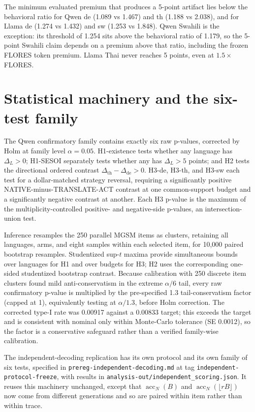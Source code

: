 \documentclass[11pt]{article}
\begin{document}
The minimum evaluated premium that produces a 5-point artifact lies below the behavioral ratio for Qwen de (1.089 vs 1.467) and th (1.188 vs 2.038), and for Llama de (1.274 vs 1.432) and sw (1.253 vs 1.848). Qwen Swahili is the exception: its threshold of 1.254 sits above the behavioral ratio of 1.179, so the 5-point Swahili claim depends on a premium above that ratio, including the frozen FLORES token premium. Llama Thai never reaches 5 points, even at \(1.5\times\) FLORES.

\section{Statistical machinery and the six-test family}
\label{app:stats}

The Qwen confirmatory family contains exactly six raw p-values, corrected by Holm at family level \(\alpha=0.05\). H1-existence tests whether any language has \(\Delta_L>0\); H1-SESOI separately tests whether any has \(\Delta_L>5\) points; and H2 tests the directional ordered contrast \(\Delta_{\mathrm{th}}-\Delta_{\mathrm{de}}>0\). H3-de, H3-th, and H3-sw each test for a dollar-matched strategy reversal, requiring a significantly positive NATIVE-minus-TRANSLATE-ACT contrast at one common-support budget and a significantly negative contrast at another. Each H3 p-value is the maximum of the multiplicity-controlled positive- and negative-side p-values, an intersection-union test.

Inference resamples the 250 parallel MGSM items as clusters, retaining all languages, arms, and eight samples within each selected item, for 10,000 paired bootstrap resamples. Studentized sup-\(t\) maxima provide simultaneous bounds over languages for H1 and over budgets for H3; H2 uses the corresponding one-sided studentized bootstrap contrast. Because calibration with 250 discrete item clusters found mild anti-conservatism in the extreme \(\alpha/6\) tail, every raw confirmatory p-value is multiplied by the pre-specified 1.3 tail-conservatism factor (capped at 1), equivalently testing at \(\alpha/1.3\), before Holm correction.
The corrected type-I rate was 0.00917 against a 0.00833 target; this exceeds the target and is consistent with nominal only within Monte-Carlo tolerance (SE 0.0012), so the factor is a conservative safeguard rather than a verified family-wise calibration.

The independent-decoding replication has its own protocol and its own family of six tests, specified in \texttt{prereg-independent-decoding.md} at tag \texttt{independent-protocol-freeze}, with results in \texttt{analysis-out/independent\_scoring.json}. It reuses this machinery unchanged, except that \(\operatorname{acc}_N(B)\) and \(\operatorname{acc}_N(\lfloor rB\rfloor)\) now come from different generations and so are paired within item rather than within trace.
\end{document}
